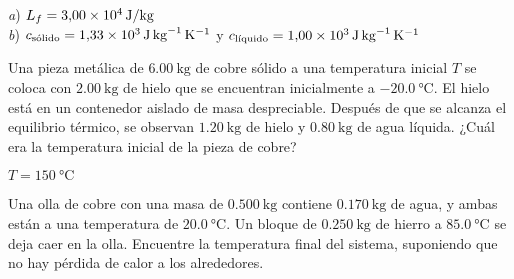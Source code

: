 \begin{Answer}
	\begin{minipage}[t]{.4\textwidth}
    \textit{a}) $ L_f = \SI{3.00E4}{\joule/\kilogram}$\\ \textit{b}) $c_\text{sólido}=\SI{1.33E3}{\joule.\kilogram^{-1}.\kelvin^{-1}}$ y $c_\text{líquido}=\SI{1.00E3}{\joule.\kilogram^{-1}.\kelvin^{-1}}$
  \end{minipage}
\end{Answer}
%
\begin{center}
  \end{center}
%
\begin{Exercise}
  Una pieza metálica de $\SI{6.00}{\kilogram}$ de cobre sólido a una temperatura inicial $T$ se coloca con $\SI{2.00}{\kilogram}$ de hielo que se encuentran inicialmente a $\SI{-20.0}{\celsius}$. El hielo está en un contenedor aislado de masa despreciable. Después de que se alcanza el equilibrio térmico, se observan $\SI{1.20}{\kilogram}$ de hielo y $\SI{0.80}{\kilogram}$ de agua líquida. ¿Cuál era la temperatura inicial de la pieza de cobre?
\end{Exercise}
\begin{Answer}
  $T=\SI{150}{\celsius}$
\end{Answer}
%
\begin{Exercise}
  Una olla de cobre con una masa de $\SI{0.500}{\kilogram}$ contiene $\SI{0.170}{\kilogram}$ de agua, y ambas están a una temperatura de $\SI{20.0}{\celsius}$. Un bloque de $\SI{0.250}{\kilogram}$ de hierro a $\SI{85.0}{\celsius}$ se deja caer en la olla. Encuentre la temperatura final del sistema, suponiendo que no hay pérdida de calor a los alrededores.
\end{Exercise}
